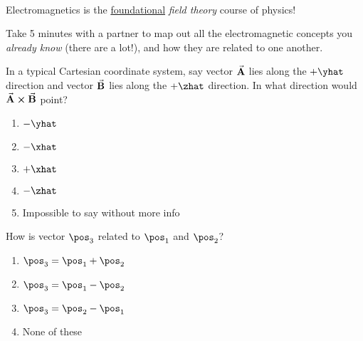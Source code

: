 \documentclass[pdf,aspectratio=169]{beamer}
\begin{document}
\begin{frame}{}
	\begin{center}
		\\
		\pause
		\vspace{1cm}
		Electromagnetics is the \underline{foundational} \emph{field theory} course of physics!
	\end{center}
\end{frame}

\begin{frame}{}
	Take 5 minutes with a partner to map out all the electromagnetic concepts you \emph{already know} (there are a lot!), and how they are related to one another.
\end{frame}

\begin{frame}{}
	In a typical Cartesian coordinate system, say vector $\va{A}$ lies along the $+\yhat$ direction and vector $\va{B}$ lies along the $+\zhat$ direction. In what direction would $\va{A}\cross\va{B}$ point?
	\begin{enumerate}
		\item $-\yhat$
		\item $-\xhat$
		\item $+\xhat$
		\item $-\zhat$
		\item Impossible to say without more info
	\end{enumerate}
\end{frame}

\begin{frame}{}
	How is vector $\pos_3$ related to $\pos_1$ and $\pos_2$?
	\begin{center}
		\begin{enumerate}
			\item $\pos_3 = \pos_1 + \pos_2$
			\item $\pos_3 = \pos_1 - \pos_2$
			\item $\pos_3 = \pos_2 - \pos_1$
			\item None of these
		\end{enumerate}
	\end{center}
\end{frame}
\end{document}
